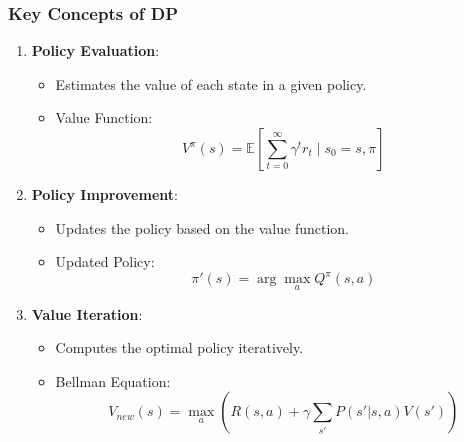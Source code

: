 \documentclass{beamer}
\begin{document}
\begin{frame}
    \frametitle{Key Concepts of DP}
    \begin{enumerate}
        \item \textbf{Policy Evaluation}:
            \begin{itemize}
                \item Estimates the value of each state in a given policy.
                \item Value Function: 
                \begin{equation}
                    V^\pi(s) = \mathbb{E}\left[ \sum_{t=0}^{\infty} \gamma^t r_t \mid s_0 = s, \pi \right]
                \end{equation}
            \end{itemize}

        \item \textbf{Policy Improvement}:
            \begin{itemize}
                \item Updates the policy based on the value function.
                \item Updated Policy: 
                \begin{equation}
                    \pi'(s) = \arg\max_a Q^\pi(s, a)
                \end{equation}
            \end{itemize}

        \item \textbf{Value Iteration}:
            \begin{itemize}
                \item Computes the optimal policy iteratively.
                \item Bellman Equation:
                \begin{equation}
                    V_{new}(s) = \max_a \left( R(s, a) + \gamma \sum_{s'} P(s'|s, a)V(s') \right)
                \end{equation}
            \end{itemize}
    \end{enumerate}
\end{frame}
\end{document}

